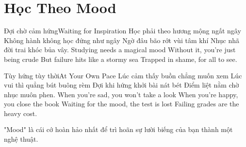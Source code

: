 \chapter{Học Theo Mood}

\begin{tutuyetbox}{Đợi chờ cảm hứng}{Waiting for Inspiration}
Học phải theo hương mộng ngất ngây
Không hành không học đứng như ngây
Ngờ đâu bão rớt vùi tâm khí
Nhục nhã đời trai khóc bủa vây.
\tcblower
Studying needs a magical mood 
Without it, you're just being crude 
But failure hits like a stormy sea 
Trapped in shame, for all to see.
\end{tutuyetbox}

\begin{tutuyetbox}{Tùy hứng tùy thời}{At Your Own Pace}
Lúc cảm thấy buồn chẳng muốn xem
Lúc vui thì quẳng bút buông rèm
Đợi khi hứng khởi bài nát bét
Điểm liệt nằm chờ nhục muôn phen.
\tcblower
When you're sad, you won't take a look 
When you're happy, you close the book 
Waiting for the mood, the test is lost 
Failing grades are the heavy cost.
\end{tutuyetbox}

\begin{ghichu}
"Mood" là cái cớ hoàn hảo nhất để trì hoãn sự lười biếng của bạn thành một nghệ thuật.
\end{ghichu}